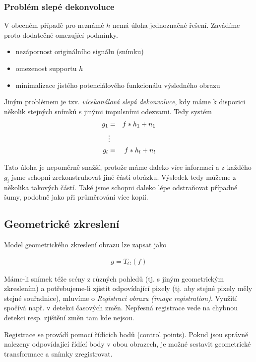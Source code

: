 \subsubsection{Problém slepé dekonvoluce}
V obecném případě pro neznámé $h$ nemá úloha jednoznačné řešení. Zavádíme proto dodatečné omezující podmínky.

\begin{itemize}
\item nezápornost originálního signálu (snímku)
\item omezenost supportu $h$
\item minimalizace jistého potenciálového funkcionálu výsledného obrazu
\end{itemize}

Jiným problémem je tzv. {\em vícekanálová slepá dekonvoluce}, kdy máme k dispozici několik stejných snímků s jinými
impulsními odezvami. Tedy systém
\begin{eqnarray}
g_1&=&f\ast h_1+n_1\\
&\vdots&\nonumber\\
g_l&=&f\ast h_l+n_l
\end{eqnarray}

Tato úloha je nepoměrně snažší, protože máme daleko více informací a z každého $g_i$ jsme schopni zrekonstruhovat 
jiné části obrázku. Výsledek tedy můžeme  z několika takových částí. Také jsme schopni daleko lépe 
odstraňovat případné šumy, podobně jako při průměrování více kopií.

\subsection{Geometrické zkreslení}
Model geometrického zkreslení obrazu lze zapsat jako

\begin{eqnarray}
g=T_G(f)
\end{eqnarray}

Máme-li snímek téže scény z různých pohledů (tj. s jiným geometrickým zkreslením) a potřebujeme-li zjistit odpovídající
pixely (tj. aby stejné pixely měly stejné souřadnice), mluvíme o {\em Registraci obrazu (image registration)}. Využití
spočívá např. v detekci časových změn. Nepřesná registrace vede na chybnou detekci resp. zjištění změn tam kde nejsou.

Registrace se provádí pomocí řídících bodů (control points). Pokud jsou správně nalezeny odpovídající řídící body v obou
obrazech, je možné sestavit geometrické transformace a snímky zregistrovat.

